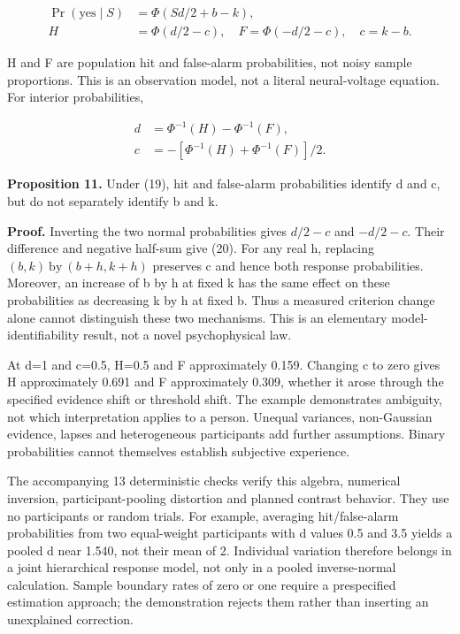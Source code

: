 \documentclass[
  american,
  11pt,
  letterpaper,
]{article}
\begin{document}
\begin{equation}
\begin{aligned}\Pr(\mathrm{yes}\mid S)&=\Phi(Sd/2+b-k),\\ H&=\Phi(d/2-c),\quad F=\Phi(-d/2-c),\quad c=k-b.\end{aligned}\tag{19}
\end{equation}

H and F are population hit and false-alarm probabilities, not noisy sample proportions. This is an observation model, not a literal neural-voltage equation. For interior probabilities,

\begin{equation}
\begin{aligned}d&=\Phi^{-1}(H)-\Phi^{-1}(F),\\ c&=-[\Phi^{-1}(H)+\Phi^{-1}(F)]/2.\end{aligned}\tag{20}
\end{equation}

\textbf{Proposition 11.} Under (19), hit and false-alarm probabilities identify d and c, but do not separately identify b and k.

\textbf{Proof.} Inverting the two normal probabilities gives \(d/2-c\) and \(-d/2-c\). Their difference and negative half-sum give (20). For any real h, replacing \((b,k)\ \text{by}\ (b+h,k+h)\) preserves c and hence both response probabilities. Moreover, an increase of b by h at fixed k has the same effect on these probabilities as decreasing k by h at fixed b. Thus a measured criterion change alone cannot distinguish these two mechanisms. This is an elementary model-identifiability result, not a novel psychophysical law.

At d=1 and c=0.5, H=0.5 and F approximately 0.159. Changing c to zero gives H approximately 0.691 and F approximately 0.309, whether it arose through the specified evidence shift or threshold shift. The example demonstrates ambiguity, not which interpretation applies to a person. Unequal variances, non-Gaussian evidence, lapses and heterogeneous participants add further assumptions. Binary probabilities cannot themselves establish subjective experience.

The accompanying 13 deterministic checks verify this algebra, numerical inversion, participant-pooling distortion and planned contrast behavior. They use no participants or random trials. For example, averaging hit/false-alarm probabilities from two equal-weight participants with d values 0.5 and 3.5 yields a pooled d near 1.540, not their mean of 2. Individual variation therefore belongs in a joint hierarchical response model, not only in a pooled inverse-normal calculation. Sample boundary rates of zero or one require a prespecified estimation approach; the demonstration rejects them rather than inserting an unexplained correction.
\end{document}
